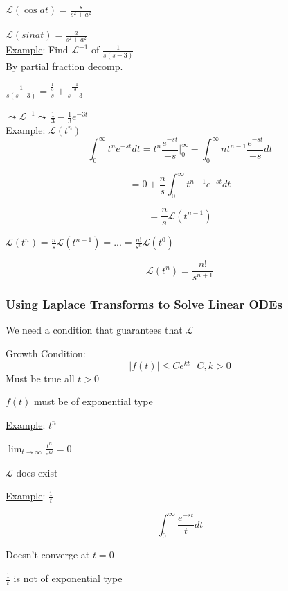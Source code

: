\documentclass[12pt]{article}
\numberwithin{equation}{subsection}
\newcommand{\absp}[1]{\left\vert #1 \right\vert}
\newcommand{\indd}{\hspace{2cm}}
\newcommand{\indf}{\hspace{3cm}}
\newcommand{\indj}{\hspace{5cm}}
\newcommand{\indn}{\hspace{7cm}}
\newcommand{\exa}{\noindent \underline{Example}: \hspace{1cm}}
\begin{document}
\indd $\displaystyle \mathscr{L}(\cos at) =\frac{s}{s^2+a^2}$

\indd $\displaystyle \mathscr{L}(sin at) =\frac{a}{s^2+a^2} $\\

\exa Find $\mathscr{L}^{-1}$ of $\frac{1}{s(s-3)}$\\

By partial fraction decomp.

\indd $\displaystyle \frac{1}{s(s-3)} = \frac{\frac{1}{3}}{s}+ \frac{\frac{-1}{3}}{s+3}$

\indf $\leadsto \mathscr{L}^{-1} \leadsto \ \frac{1}{3}-\frac{1}{3}e^{-3t}$\\


\exa $\mathscr{L}(t^n)$\\

$$ \int_0^\infty t^ne^{-st} dt = t^n \frac{e^{-st}}{-s} \biggr\rvert^{\infty}_0 -\int_0^\infty nt^{n-1} \frac{e^{-st}}{-s} dt $$

$$ = 0 +\frac{n}{s} \int_0^\infty t^{n-1} e^{-st} dt  $$

$$ = \frac{n}{s} \mathscr{L}(t^{n-1}) $$

\indd $ \mathscr{L}(t^{n})= \frac{n}{s} \mathscr{L}(t^{n-1})= ... = \frac{n!}{s^n} \mathscr{L}(t^{0})$

$$ \mathscr{L}(t^{n}) = \frac{n!}{s^{n+1}}$$

\subsubsection{Using Laplace Transforms to Solve Linear ODEs}

We need a condition that guarantees that $\mathscr{L}$

Growth Condition:
\begin{equation}
\absp{f(t)} \leqslant Ce^{kt}\ \ \ C, k > 0
\end{equation} 
\indn Must be true all $t>0$

\indj $f(t)$ must be of exponential type

\exa $t^n$

\indd $\displaystyle \lim_{t \rightarrow \infty} \frac{t^n}{e^{kt}} = 0$

\indd $\mathscr{L}$ does exist
\newpage

\exa $\frac{1}{t}$

$$ \int_0^\infty \frac{e^{-st}}{t} dt$$

\indj Doesn't converge at $t=0$

\indj $\frac{1}{t}$ is not of exponential type\\
\end{document}
